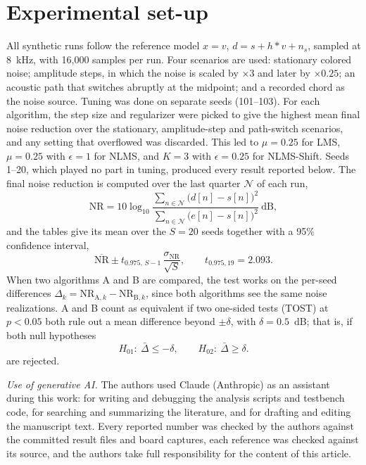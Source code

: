 \section{Experimental set-up}\label{sec:setup}
All synthetic runs follow the reference model $x=v$, $d=s+h*v+n_s$, sampled at 8~kHz, with 16,000
samples per run. Four scenarios are used: stationary colored noise; amplitude steps, in which the noise is
scaled by $\times3$ and later by $\times0.25$; an acoustic path that switches abruptly at the midpoint; and
a recorded chord as the noise source. Tuning was done on separate seeds (101--103). For each algorithm,
the step size and regularizer were picked to give the highest mean final noise reduction over the
stationary, amplitude-step and path-switch scenarios, and any setting that overflowed was discarded. This
led to $\mu=0.25$ for LMS, $\mu=0.25$ with $\epsilon=1$ for NLMS, and $K=3$ with $\epsilon=0.25$ for
NLMS-Shift. Seeds 1--20, which played no part in tuning, produced every result reported below. The final
noise reduction is computed over the last quarter $\mathcal{N}$ of each run,
\begin{equation}
\mathrm{NR}=10\log_{10}\frac{\sum_{n\in\mathcal{N}}\big(d[n]-s[n]\big)^2}{\sum_{n\in\mathcal{N}}\big(e[n]-s[n]\big)^2}\ \text{dB},
\label{eq:nr}
\end{equation}
and the tables give its mean over the $S=20$ seeds together with a 95\% confidence interval,
\begin{equation}
\overline{\mathrm{NR}}\pm t_{0.975,\,S-1}\,\frac{\sigma_{\mathrm{NR}}}{\sqrt{S}},\qquad t_{0.975,19}=2.093 .
\label{eq:ci}
\end{equation}
When two algorithms A and B are compared, the test works on the per-seed differences
$\Delta_k=\mathrm{NR}_{\mathrm{A},k}-\mathrm{NR}_{\mathrm{B},k}$, since both algorithms see the same noise
realizations. A and B count as equivalent if two one-sided tests (TOST) at $p<0.05$ both rule out a mean
difference beyond $\pm\delta$, with $\delta=0.5$~dB; that is, if both null hypotheses
\begin{equation}
H_{01}:\ \bar\Delta\le-\delta,\qquad H_{02}:\ \bar\Delta\ge\delta .
\label{eq:tost}
\end{equation}
are rejected.

\emph{Use of generative AI.} The authors used Claude (Anthropic) as an assistant during this work: for
writing and debugging the analysis scripts and testbench code, for searching and summarizing the
literature, and for drafting and editing the manuscript text.  Every reported number was
checked by the authors against the committed result files and board captures, each reference was checked
against its source, and the authors take full responsibility for the content of this article.


